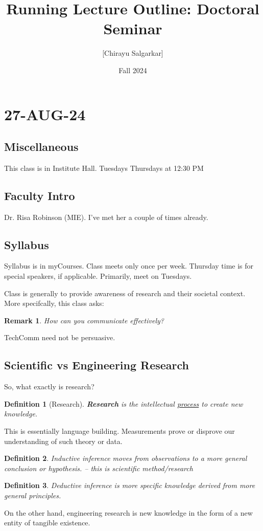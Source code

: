 \documentclass[10pt, oneside]{article}
\title{Running Lecture Outline: Doctoral Seminar}
\author{[Chirayu Salgarkar]}
\date{Fall 2024}
\newtheorem{defn}{Definition}
\newtheorem{rem}{Remark}
\begin{document}
\maketitle
\tableofcontents

\vspace{.25in}

\section{27-AUG-24}

\subsection{Miscellaneous}

This class is in Institute Hall. Tuesdays Thursdays at 12:30 PM

\subsection{Faculty Intro}
Dr. Risa Robinson (MIE). I've met her a couple of times already. 
\subsection{Syllabus}
Syllabus is in myCourses. Class meets only once per week. Thursday time is for special speakers, if applicable. Primarily, meet on Tuesdays. 

Class is generally to provide awareness of research and their societal context. More specifcally, this class asks:

\begin{rem}
    How can you communicate effectively?
\end{rem}
TechComm need not be persuasive. 


\subsection{Scientific vs Engineering Research}
So, what exactly is research?

    
\begin{defn}[Research]
    \textbf{Research} is the intellectual \underline{process} to create new knowledge. 
\end{defn}
This is essentially language building. Measurements prove or disprove our understanding of such theory or data. 
\begin{defn}
Inductive inference moves from observations to a more general conclusion or hypothesis.  -- this is scientific method/research
\end{defn}
\begin{defn}
    Deductive inference is more specific knowledge derived from more general principles.
\end{defn}
On the other hand, engineering research is new knowledge in the form of a new entity of tangible existence. 
\end{document}
